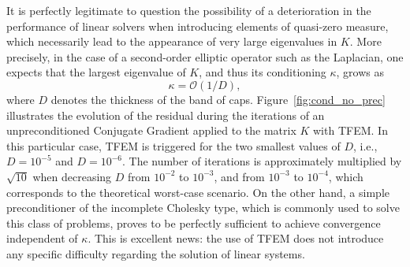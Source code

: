 \documentclass{article}
\theoremstyle{remark}
\begin{document}

It is perfectly legitimate to question the possibility of a deterioration in the performance of linear solvers when introducing elements of quasi-zero measure, which necessarily lead to the appearance of very large eigenvalues in $K$. More precisely, in the case of a second-order elliptic operator such as the Laplacian, one expects that the largest eigenvalue of $K$, and thus its conditioning $\kappa$, grows as 
\[
\kappa = \mathcal{O}(1/D),
\] 
where $D$ denotes the thickness of the band of caps. Figure~\ref{fig:cond_no_prec} illustrates the evolution of the residual during the iterations of an unpreconditioned Conjugate Gradient applied to the matrix $K$ with TFEM. In this particular case, TFEM is triggered for the two smallest values of $D$, i.e., $D=10^{-5}$ and $D=10^{-6}$. The number of iterations is approximately multiplied by $\sqrt{10}$ when decreasing $D$ from $10^{-2}$ to $10^{-3}$, and from $10^{-3}$ to $10^{-4}$, which corresponds to the theoretical worst-case scenario. On the other hand, a simple preconditioner of the incomplete Cholesky type, which is commonly used to solve this class of problems, proves to be perfectly sufficient to achieve convergence independent of $\kappa$. This is excellent news: the use of TFEM does not introduce any specific difficulty regarding the solution of linear systems.
\end{document}
